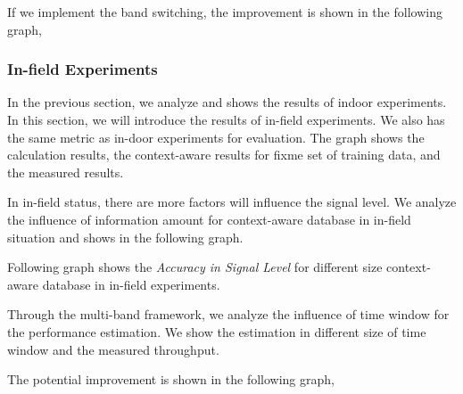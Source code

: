 If we implement the band switching, the improvement is shown in the following graph,




















\subsubsection{In-field Experiments} 
In the previous section, we analyze and shows the results of indoor experiments. In this section, we will introduce the results of in-field experiments.
We also has the same metric as in-door experiments for evaluation. 
The graph shows the calculation results, the context-aware results for fixme set of training data, and the measured results.


In in-field status, there are more factors will influence the signal level. We analyze the influence of information amount for context-aware database in in-field situation and shows in the following graph.


Following graph shows the \emph{Accuracy in Signal Level} for different size context-aware database in in-field experiments.



Through the multi-band framework, we analyze the influence of time window for the performance estimation. We show the estimation in different size of time window and the measured throughput.




The potential improvement is shown in the following graph,


























